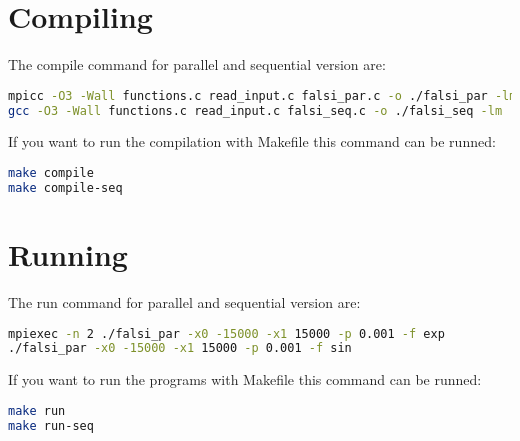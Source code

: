 \documentclass[a4paper,11pt,oneside]{book}
\begin{document}
\section*{Compiling}


The compile command for parallel and sequential version are:
\begin{lstlisting}[language=Bash]
mpicc -O3 -Wall functions.c read_input.c falsi_par.c -o ./falsi_par -lm
gcc -O3 -Wall functions.c read_input.c falsi_seq.c -o ./falsi_seq -lm
\end{lstlisting}

If you want to run the compilation with Makefile this command can be runned:
\begin{lstlisting}[language=Bash]
make compile
make compile-seq
\end{lstlisting}

\section*{Running}

The run command for parallel and sequential version are:
\begin{lstlisting}[language=Bash]
mpiexec -n 2 ./falsi_par -x0 -15000 -x1 15000 -p 0.001 -f exp
./falsi_par -x0 -15000 -x1 15000 -p 0.001 -f sin
\end{lstlisting}

If you want to run the programs with Makefile this command can be runned:
\begin{lstlisting}[language=Bash]
make run
make run-seq
\end{lstlisting}
\end{document}
